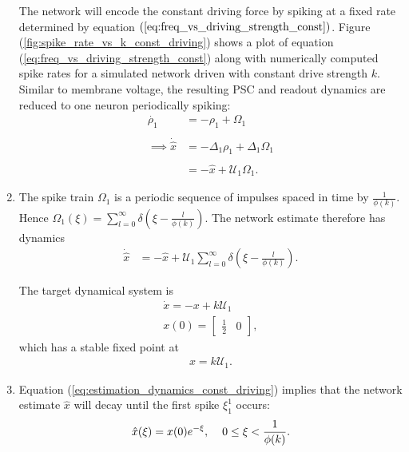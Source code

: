 \begin{enumerate}
The network will encode the constant driving force by spiking at a fixed rate determined by equation $(\ref{eq:freq_vs_driving_strength_const})$. Figure (\ref{fig:spike_rate_vs_k_const_driving}) shows a plot of equation (\ref{eq:freq_vs_driving_strength_const}) along with numerically computed spike rates for a simulated network driven with constant drive strength $k$.  Similar to membrane voltage, the resulting PSC and readout dynamics are reduced to one neuron periodically spiking:
\begin{align*}
\dot{\rho_1} &= -\rho_1 + \Omega_1 \\ 
\\
\implies 
\dot{\hat{x}} &= - \Delta_1 \rho_1 + \Delta_1 \Omega_1\\
\\ 
&= - \hat{x} + \mathcal{U}_1 \Omega_1. 
\end{align*}



\item The spike train $\Omega_1$ is a periodic sequence of impulses spaced in time by $\frac{1}{\phi(k)}$. Hence $\Omega_1(\xi) = \sum_{l=0}^{\infty} \delta \left(\xi - \frac{l}{\phi(k)}\right).$
The network estimate therefore has dynamics
\begin{align}
\label{eq:estimation_dynamics_const_driving}
\dot{\hat{x}} &= -\hat{x}  + \mathcal{U}_1 \sum_{l=0}^{\infty} \delta \left(\xi - \frac{l}{\phi(k)}\right).
\end{align}

The target dynamical system is
\begin{align*}
\dot{x} = - x + k 
 \mathcal{U}_1 \\
 x(0) = \begin{bmatrix} \frac{1}{2} & 0 \end{bmatrix},
\end{align*}
which has a stable fixed point at
\begin{align}
\label{eq:steady_state_dynamics_const_driving}
x = k \mathcal{U}_1.
\end{align}

\item Equation (\ref{eq:estimation_dynamics_const_driving}) implies that the network estimate $\hat{x}$ will decay until the first spike $\xi_1^1$ occurs:
\begin{align*}
\hat{x}(\xi) = x(0) e^{-\xi}, \hspace{4mm} 0 \leq \xi < \frac{1}{\phi(k)}.
\end{align*}



\end{enumerate}
